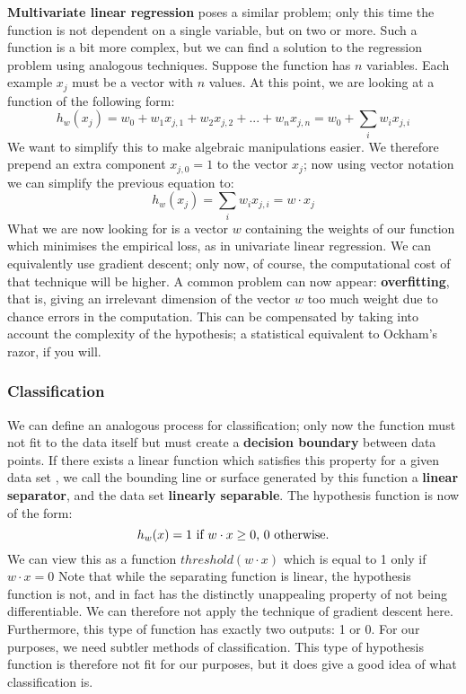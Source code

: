     \textbf{Multivariate linear regression} poses a similar problem;
    only this time the function is not dependent on a single variable, but
    on two or more. Such a function is a bit more complex, but we can
    find a solution to the regression problem using analogous
    techniques. Suppose the function has $n$ variables. Each example $x_j$
    must be a vector with $n$ values. At this point, we are looking at a
    function of the following form:
    \begin{equation}
      h_w(x_j) = w_0 + w_1x_{j,1} + w_2x_{j,2} + ... + w_nx_{j,n} = w_0 + \sum\limits_{i} w_ix_{j,i}
    \end{equation}
    We want to simplify this to make algebraic manipulations
    easier. We therefore prepend an extra component $x_{j,0} = 1$ to the
    vector $x_j$; now using vector notation we can simplify the
    previous equation to:
    \begin{equation}
      h_w(x_j) = \sum\limits_{i} w_ix_{j,i} = w \cdot x_j
    \end{equation}
    What we are now looking for is a vector $w$ containing the weights
of our function which minimises the empirical loss, as in univariate
linear regression. We can equivalently use gradient descent; only now,
of course, the computational cost of that technique will be higher. A
common problem can now appear: \textbf{overfitting}, that is, giving
an irrelevant dimension of the vector $w$ too much weight due to
chance errors in the computation. This can be compensated by taking
into account the complexity of the hypothesis; a statistical
equivalent to Ockham's razor, if you will.

\subsubsection{Classification} 

We can define an analogous process for classification; only now
the function must not fit to the data itself but must create a
\textbf{decision boundary} between data points. If there exists a
linear function which satisfies this property for a given data set
, we call the bounding line or surface generated by this function a
\textbf{linear separator}, and the data set \textbf{linearly
  separable}. The hypothesis function is now of the form:
\begin{equation}
  h_w(x) = 1$ if $ w \cdot x \geq 0$, $0$ otherwise.$
\end{equation}
We can view this as a function $threshold(w \cdot x)$ which is
equal to 1 only if $w \cdot x = 0$ Note that while the separating
function is linear, the hypothesis function is not, and in fact has
the distinctly unappealing property of not being differentiable. We
can therefore not apply the technique of gradient descent
here. Furthermore, this type of function has exactly two outputs: 1 or
0. For our purposes, we need subtler methods of classification.  This
type of hypothesis function is therefore not fit for our purposes, but
it does give a good idea of what classification is.

